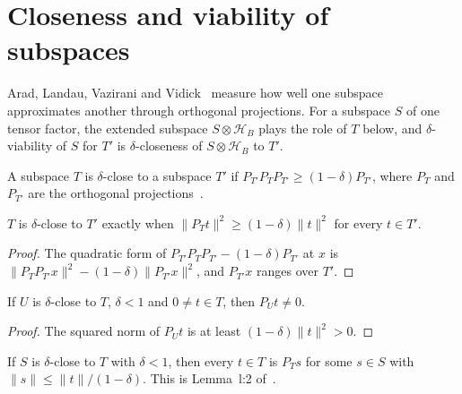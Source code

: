 \section{Closeness and viability of subspaces}

Arad, Landau, Vazirani and Vidick~\cite[Section~s:vs]{Arad2016RigorousRG}
measure how well one subspace approximates another through orthogonal
projections. For a subspace $S$ of one tensor factor, the extended subspace
$S\otimes\mathcal H_B$ plays the role of $T$ below, and $\delta$-viability of
$S$ for $T'$ is $\delta$-closeness of $S\otimes\mathcal H_B$ to $T'$.

\begin{definition}[Closeness]
    \label{def:subspace_close}
    \leanok
    A subspace $T$ is $\delta$-close to a subspace $T'$ if
    $P_{T'}P_TP_{T'}\ge(1-\delta)P_{T'}$, where $P_T$ and $P_{T'}$ are the
    orthogonal projections~\cite[lines 433--440 and 469--474]{Arad2016RigorousRG}.
\end{definition}

\begin{theorem}
    \label{thm:subspace_close_iff}
    \leanok
    $T$ is $\delta$-close to $T'$ exactly when
    $\lVert P_Tt\rVert^2\ge(1-\delta)\lVert t\rVert^2$ for every $t\in T'$.
\end{theorem}

\begin{proof}
    \leanok
    The quadratic form of $P_{T'}P_TP_{T'}-(1-\delta)P_{T'}$ at $x$ is
    $\lVert P_TP_{T'}x\rVert^2-(1-\delta)\lVert P_{T'}x\rVert^2$, and
    $P_{T'}x$ ranges over $T'$.
\end{proof}

\begin{lemma}
    \label{lem:close_target_projection_ne_zero}
    \leanok
    If $U$ is $\delta$-close to $T$, $\delta<1$ and $0\ne t\in T$,
    then $P_Ut\ne0$.
\end{lemma}
\begin{proof}\leanok
    The squared norm of $P_Ut$ is at least
    $(1-\delta)\|t\|^2>0$.
\end{proof}

\begin{theorem}
    \label{thm:subspace_close_preimage}
    \leanok
    If $S$ is $\delta$-close to $T$ with $\delta<1$, then every $t\in T$ is
    $P_Ts$ for some $s\in S$ with
    $\lVert s\rVert\le\lVert t\rVert/(1-\delta)$. This is Lemma~l:2
    of~\cite[lines 449--465]{Arad2016RigorousRG}.
\end{theorem}

